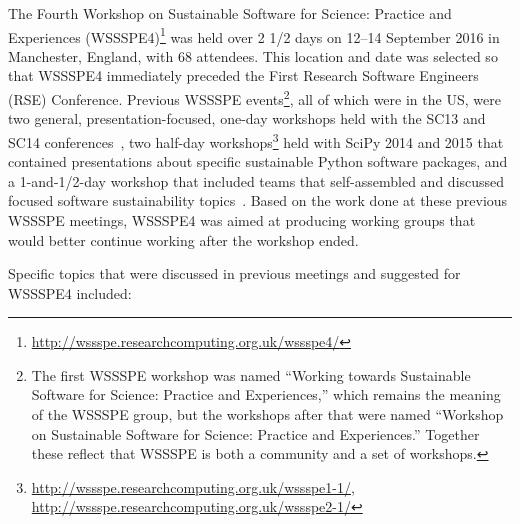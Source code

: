 \documentclass[11pt, oneside]{amsart}
\begin{document}
The Fourth Workshop on Sustainable Software for Science: Practice and Experiences
(WSSSPE4)\footnote{\url{http://wssspe.researchcomputing.org.uk/wssspe4/}} was
held over 2 1/2 days on 12--14 September 2016 in Manchester, England, with 68 attendees.
This location and date was selected so that WSSSPE4 immediately preceded the
First Research Software Engineers (RSE) Conference.
Previous WSSSPE events\footnote{The first WSSSPE workshop was named
``Working towards
Sustainable Software for Science: Practice and Experiences,'' which remains the meaning
of the WSSSPE group, but the workshops after that were named
``Workshop on Sustainable
Software for Science: Practice and Experiences.'' Together these reflect
that WSSSPE is both a community and a set of workshops.}, all of which were in the US, were two general, presentation-focused, one-day workshops held with the SC13 and SC14 conferences~\cite{WSSSPE1-pre-report,WSSSPE1, WSSSPE2-pre-report,WSSSPE2},
two half-day workshops\footnote{\url{http://wssspe.researchcomputing.org.uk/wssspe1-1/}, \url{http://wssspe.researchcomputing.org.uk/wssspe2-1/}} held with SciPy 2014 and 2015 that contained presentations about specific sustainable Python software packages, and a 1-and-1/2-day workshop that included teams that self-assembled and discussed focused software sustainability topics~\cite{WSSSPE3}.
%
Based on the work done at these previous WSSSPE meetings, WSSSPE4 was aimed
at producing working groups that would better continue working after the workshop ended.

Specific topics that were discussed in previous meetings and suggested for WSSSPE4 included:
\end{document}
